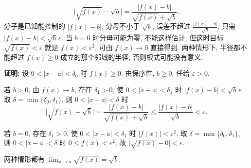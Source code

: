 \documentclass[UTF8,openany]{ctexbook}
\theoremstyle{chinesetextbook}
\newenvironment{cnproof}{\par\indent\textbf{证明:} \ignorespaces}{\par}
\begin{document}
\[
\bigl|\sqrt{f(x)}-\sqrt b\bigr|=\frac{|f(x)-b|}{\sqrt{f(x)}+\sqrt b}.
\]
分子是已知能控制的 $|f(x)-b|$, 分母不小于 $\sqrt b$, 误差不超过 $\displaystyle\frac{|f(x)-b|}{\sqrt b}$, 只需 $|f(x)-b|<\sqrt b\,\varepsilon$. 当 $b=0$ 时分母可能为零, 不能这样估计, 但这时目标 $\sqrt{f(x)}<\varepsilon$ 就是 $f(x)<\varepsilon^2$, 可由 $f(x)\to0$ 直接得到. 两种情形下, 半径都不能超过 $f(x)\ge0$ 成立的那个邻域的半径, 否则根式可能没有意义.
\begin{cnproof}
设 $0<|x-a|<\delta_0$ 时 $f(x)\ge0$. 由保序性, $b\ge0$. 任给 $\varepsilon>0$.

若 $b>0$, 由 $f(x)\to b$, 存在 $\delta_1>0$, 使 $0<|x-a|<\delta_1$ 时 $|f(x)-b|<\sqrt b\,\varepsilon$. 取 $\delta=\min\{\delta_0,\delta_1\}$, 则 $0<|x-a|<\delta$ 时
\[
\bigl|\sqrt{f(x)}-\sqrt b\bigr|=\frac{|f(x)-b|}{\sqrt{f(x)}+\sqrt b}\le\frac{|f(x)-b|}{\sqrt b}<\varepsilon.
\]

若 $b=0$, 存在 $\delta_1>0$, 使 $0<|x-a|<\delta_1$ 时 $|f(x)|<\varepsilon^2$. 取 $\delta=\min\{\delta_0,\delta_1\}$, 则 $0<|x-a|<\delta$ 时 $0\le f(x)<\varepsilon^2$, 故 $\bigl|\sqrt{f(x)}-0\bigr|<\varepsilon$.

两种情形都有 $\displaystyle\lim_{x\to a}\sqrt{f(x)}=\sqrt b$.
\end{cnproof}
\end{document}

